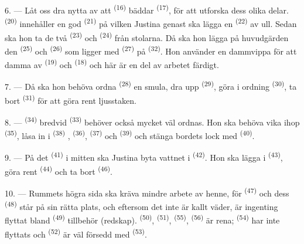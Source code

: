 6. --- Låt oss dra nytta av att  \textsuperscript{(16)} bäddar
 \textsuperscript{(17)}, för att utforska dess olika delar.
 \textsuperscript{(20)} innehåller en god
 \textsuperscript{(21)} på vilken Justina genast ska lägga
en  \textsuperscript{(22)} av ull. Sedan ska hon ta de två
 \textsuperscript{(23)} och 
\textsuperscript{(24)} från stolarna. Då ska hon lägga på huvudgärden den
 \textsuperscript{(25)} och 
\textsuperscript{(26)} som ligger med  \textsuperscript{(27)} på
 \textsuperscript{(32)}. Hon använder en dammvippa för att damma av
 \textsuperscript{(19)} och  \textsuperscript{(18)} och
här är en del av arbetet färdigt.

7. --- Då ska hon behöva ordna  \textsuperscript{(28)} en smula, dra
upp  \textsuperscript{(29)}, göra i ordning
 \textsuperscript{(30)}, ta bort 
\textsuperscript{(31)} för att göra rent ljusstaken.

\VUsaut{5.0mm}
\VUsaut{3.0mm}

8. ---  \textsuperscript{(34)} bredvid  \textsuperscript{(33)}
behöver också mycket väl ordnas. Hon ska behöva vika ihop 
\textsuperscript{(35)}, låsa in i  \textsuperscript{(38)}
,  \textsuperscript{(36)}, 
\textsuperscript{(37)} och
 \textsuperscript{(39)} och stänga bordets lock med
 \textsuperscript{(40)}.

9. --- På det  \textsuperscript{(41)} i mitten ska Justina byta vattnet
i  \textsuperscript{(42)}. Hon ska lägga
 i  \textsuperscript{(43)}, göra rent
 \textsuperscript{(44)} och ta bort 
\textsuperscript{(46)}.

10. --- Rummets högra sida ska kräva mindre arbete av henne, för 
\textsuperscript{(47)} och dess  \textsuperscript{(48)} står på sin rätta plats,
och eftersom det inte är kallt väder, är ingenting flyttat bland 
\textsuperscript{(49)} tillbehör (redskap).  \textsuperscript{(50)},
 \textsuperscript{(51)},  \textsuperscript{(55)},
 \textsuperscript{(56)} är rena; 
\textsuperscript{(54)} har inte flyttats och  \textsuperscript{(52)} är väl
försedd med  \textsuperscript{(53)}.

